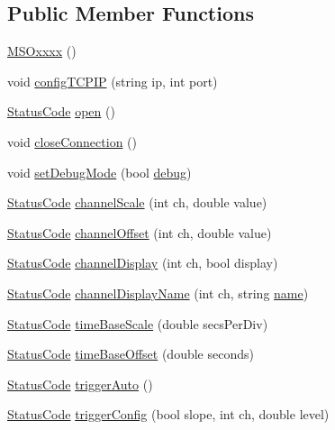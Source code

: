 \subsection*{Public Member Functions}
\begin{DoxyCompactItemize}
\item 
\hyperlink{classMSOxxxx_afa2d5e8dcabe88d8c4ef54238a4e7bc7}{M\+S\+Oxxxx} ()
\item 
void \hyperlink{classMSOxxxx_a3fc4e785c764c2abb0c0c2da4d71108a}{config\+T\+C\+P\+IP} (string ip, int port)
\item 
\hyperlink{classStatusCode}{Status\+Code} \hyperlink{classMSOxxxx_a4acff38c6f55795533c4d6b4cef6106b}{open} ()
\item 
void \hyperlink{classMSOxxxx_a65fd9540df836c24a044807f12071c92}{close\+Connection} ()
\item 
void \hyperlink{classMSOxxxx_a59a1d5e5f537086590b60a93d5c4c8a1}{set\+Debug\+Mode} (bool \hyperlink{classObject_aac010553f022165573714b7014a15f0d}{debug})
\item 
\hyperlink{classStatusCode}{Status\+Code} \hyperlink{classMSOxxxx_ae08131dd88d4d7f95e870b69b2f5e0e6}{channel\+Scale} (int ch, double value)
\item 
\hyperlink{classStatusCode}{Status\+Code} \hyperlink{classMSOxxxx_ab77c05543d9478b140466b7505651ab8}{channel\+Offset} (int ch, double value)
\item 
\hyperlink{classStatusCode}{Status\+Code} \hyperlink{classMSOxxxx_a4cb8e745f172b7a30953ec87923c8c76}{channel\+Display} (int ch, bool display)
\item 
\hyperlink{classStatusCode}{Status\+Code} \hyperlink{classMSOxxxx_af9851b9ce16b0e88e8691c8174ba54f0}{channel\+Display\+Name} (int ch, string \hyperlink{classObject_a300f4c05dd468c7bb8b3c968868443c1}{name})
\item 
\hyperlink{classStatusCode}{Status\+Code} \hyperlink{classMSOxxxx_a0327f511fdb8920ddabf1dbbd54f9e9f}{time\+Base\+Scale} (double secs\+Per\+Div)
\item 
\hyperlink{classStatusCode}{Status\+Code} \hyperlink{classMSOxxxx_ac23ca74ef0e746fe1830bcf26952c42d}{time\+Base\+Offset} (double seconds)
\item 
\hyperlink{classStatusCode}{Status\+Code} \hyperlink{classMSOxxxx_a44238c713464e76d4c3c2005413bdf76}{trigger\+Auto} ()
\item 
\hyperlink{classStatusCode}{Status\+Code} \hyperlink{classMSOxxxx_a9019b632465638a13c409d8243fe83b4}{trigger\+Config} (bool slope, int ch, double level)
\item 

\end{DoxyCompactItemize}
